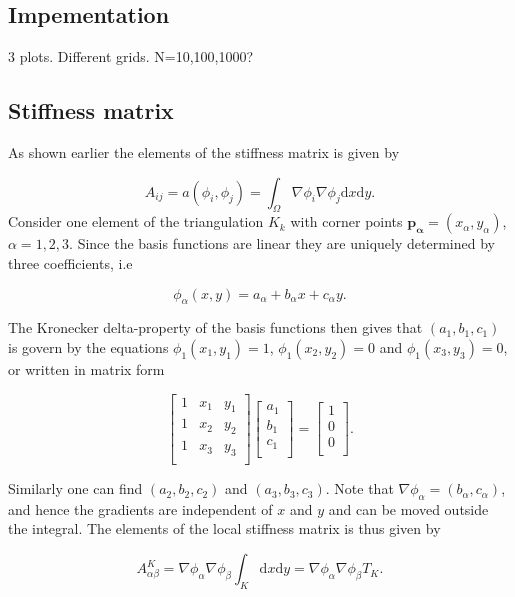 \documentclass[paper=a4, fontsize=11pt]{scrartcl} %
\begin{document}
\subsection{Impementation}
3 plots. Different grids. N=10,100,1000?
\subsection{Stiffness matrix}
As shown earlier the elements of the stiffness matrix is given by

\[ A_{ij} = a(\phi_i,\phi_j)=\int_{\Omega} \nabla \phi_i \nabla \phi_j \mathrm{d}x\mathrm{d}y.\] 
Consider one element of the triangulation $K_k$ with corner points $\mathbf{p_\alpha}=(x_\alpha,y_\alpha)$, $\alpha=1,2,3$. Since the basis functions are linear they are uniquely determined by three coefficients, i.e

\[\phi_\alpha(x,y) = a_\alpha +b_\alpha x+c_\alpha y.\]

The Kronecker delta-property of the basis functions then gives that $(a_1, b_1,c_1)$ is govern by the equations $\phi_1(x_1,y_1)=1$, $\phi_1(x_2,y_2)=0$ and $\phi_1(x_3,y_3)=0$, or written in matrix form

\begin{equation}
\begin{bmatrix}
  1 & x_1 & y_1\\
  1 & x_2 & y_2\\
  1 & x_3 & y_3\\\end{bmatrix}
\begin{bmatrix} a_1 \\ b_1\\ c_1 \\ \end{bmatrix} =
\begin{bmatrix}
  1 \\ 0\\ 0 \\
\end{bmatrix}.
\label{equation:poisson2d:C-matrix}
\end{equation}

Similarly one can find $(a_2, b_2,c_2)$ and $(a_3, b_3,c_3)$. Note that $\nabla \phi_\alpha=(b_\alpha,c_\alpha)$, and hence the gradients are independent of $x$ and $y$ and can be moved outside the integral. The elements of the local stiffness matrix is thus given by

\[ A^K_{\alpha\beta} =\nabla \phi_\alpha \nabla \phi_\beta \int_{K} \mathrm{d}x\mathrm{d}y = \nabla \phi_\alpha \nabla \phi_\beta T_K.\]
\end{document}

